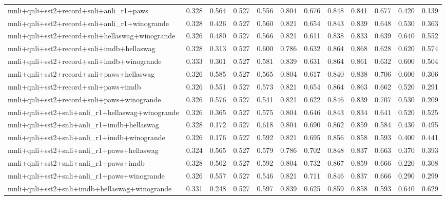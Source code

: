 \begin{table}[t]
\begin{tabular}{lrrrrrrrrrrr}
    mnli+qnli+sst2+record+snli+anli\_r1+paws & 0.328 & 0.564 & 0.527 & 0.556 & 0.804 & 0.676 & 0.848 & 0.841 & 0.677 & 0.420 & 0.139 \\
    mnli+qnli+sst2+record+snli+anli\_r1+winogrande & 0.328 & 0.426 & 0.527 & 0.560 & 0.821 & 0.654 & 0.843 & 0.839 & 0.648 & 0.530 & 0.363 \\
    mnli+qnli+sst2+record+snli+hellaswag+winogrande & 0.326 & 0.480 & 0.527 & 0.566 & 0.821 & 0.611 & 0.838 & 0.833 & 0.639 & 0.640 & 0.552 \\
    mnli+qnli+sst2+record+snli+imdb+hellaswag & 0.328 & 0.313 & 0.527 & 0.600 & 0.786 & 0.632 & 0.864 & 0.868 & 0.628 & 0.620 & 0.574 \\
    mnli+qnli+sst2+record+snli+imdb+winogrande & 0.333 & 0.301 & 0.527 & 0.581 & 0.839 & 0.631 & 0.864 & 0.861 & 0.632 & 0.600 & 0.504 \\
    mnli+qnli+sst2+record+snli+paws+hellaswag & 0.326 & 0.585 & 0.527 & 0.565 & 0.804 & 0.617 & 0.840 & 0.838 & 0.706 & 0.600 & 0.306 \\
    mnli+qnli+sst2+record+snli+paws+imdb & 0.326 & 0.551 & 0.527 & 0.573 & 0.821 & 0.654 & 0.864 & 0.863 & 0.662 & 0.520 & 0.291 \\
    mnli+qnli+sst2+record+snli+paws+winogrande & 0.326 & 0.576 & 0.527 & 0.541 & 0.821 & 0.622 & 0.846 & 0.839 & 0.707 & 0.530 & 0.209 \\
    mnli+qnli+sst2+snli+anli\_r1+hellaswag+winogrande & 0.326 & 0.365 & 0.527 & 0.575 & 0.804 & 0.646 & 0.843 & 0.834 & 0.641 & 0.520 & 0.525 \\
    mnli+qnli+sst2+snli+anli\_r1+imdb+hellaswag & 0.328 & 0.172 & 0.527 & 0.618 & 0.804 & 0.690 & 0.862 & 0.859 & 0.584 & 0.430 & 0.495 \\
    mnli+qnli+sst2+snli+anli\_r1+imdb+winogrande & 0.326 & 0.176 & 0.527 & 0.592 & 0.821 & 0.695 & 0.856 & 0.858 & 0.593 & 0.400 & 0.441 \\
    mnli+qnli+sst2+snli+anli\_r1+paws+hellaswag & 0.324 & 0.565 & 0.527 & 0.579 & 0.786 & 0.702 & 0.848 & 0.837 & 0.663 & 0.370 & 0.393 \\
    mnli+qnli+sst2+snli+anli\_r1+paws+imdb & 0.328 & 0.502 & 0.527 & 0.592 & 0.804 & 0.732 & 0.867 & 0.859 & 0.666 & 0.220 & 0.308 \\
    mnli+qnli+sst2+snli+anli\_r1+paws+winogrande & 0.326 & 0.557 & 0.527 & 0.546 & 0.821 & 0.711 & 0.846 & 0.837 & 0.666 & 0.290 & 0.299 \\
    mnli+qnli+sst2+snli+imdb+hellaswag+winogrande & 0.331 & 0.248 & 0.527 & 0.597 & 0.839 & 0.625 & 0.859 & 0.858 & 0.593 & 0.640 & 0.629 \\

\end{tabular}
\end{table}
